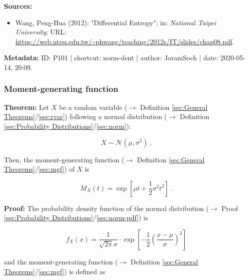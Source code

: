\documentclass[a4paper,12pt,twoside]{book}
\begin{document}
\vspace{1em}
\textbf{Sources:}
\begin{itemize}
\item Wang, Peng-Hua (2012): "Differential Entropy"; in: \textit{National Taipei University}; URL: \url{https://web.ntpu.edu.tw/~phwang/teaching/2012s/IT/slides/chap08.pdf}.
\end{itemize}


\vspace{1em}
\textbf{Metadata:} ID: P101 | shortcut: norm-dent | author: JoramSoch | date: 2020-05-14, 20:09.
\vspace{1em}



\subsubsection[\textbf{Moment-generating function}]{Moment-generating function} \label{sec:norm-mgf}
\setcounter{equation}{0}

\textbf{Theorem:} Let $X$ be a random variable ($\rightarrow$ Definition \ref{sec:General Theorems}/\ref{sec:rvar}) following a normal distribution ($\rightarrow$ Definition \ref{sec:Probability Distributions}/\ref{sec:norm}):

\begin{equation} \label{eq:norm-mgf-norm}
X \sim \mathcal{N}(\mu, \sigma^2) \; .
\end{equation}

Then, the moment-generating function ($\rightarrow$ Definition \ref{sec:General Theorems}/\ref{sec:mgf}) of $X$ is

\begin{equation} \label{eq:norm-mgf-norm-mgf}
M_X(t) = \exp\left[ \mu t + \frac{1}{2} \sigma^2 t^2 \right] \; .
\end{equation}


\vspace{1em}
\textbf{Proof:} The probability density function of the normal distribution ($\rightarrow$ Proof \ref{sec:Probability Distributions}/\ref{sec:norm-pdf}) is

\begin{equation} \label{eq:norm-mgf-norm-pdf}
f_X(x) = \frac{1}{\sqrt{2 \pi} \sigma} \cdot \exp \left[ -\frac{1}{2} \left( \frac{x-\mu}{\sigma} \right)^2 \right]
\end{equation}

and the moment-generating function ($\rightarrow$ Definition \ref{sec:General Theorems}/\ref{sec:mgf}) is defined as
\end{document}
